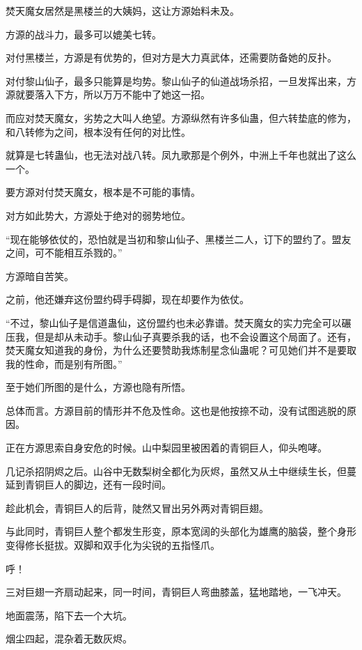 
\begin{this_body}

焚天魔女居然是黑楼兰的大姨妈，这让方源始料未及。

方源的战斗力，最多可以媲美七转。

对付黑楼兰，方源是有优势的，但对方是大力真武体，还需要防备她的反扑。

对付黎山仙子，最多只能算是均势。黎山仙子的仙道战场杀招，一旦发挥出来，方源就要落入下方，所以万万不能中了她这一招。

而应对焚天魔女，劣势之大叫人绝望。方源纵然有许多仙蛊，但六转垫底的修为，和八转修为之间，根本没有任何的对比性。

就算是七转蛊仙，也无法对战八转。凤九歌那是个例外，中洲上千年也就出了这么一个。

要方源对付焚天魔女，根本是不可能的事情。

对方如此势大，方源处于绝对的弱势地位。

“现在能够依仗的，恐怕就是当初和黎山仙子、黑楼兰二人，订下的盟约了。盟友之间，可不能相互杀戮的。”

方源暗自苦笑。

之前，他还嫌弃这份盟约碍手碍脚，现在却要作为依仗。

“不过，黎山仙子是信道蛊仙，这份盟约也未必靠谱。焚天魔女的实力完全可以碾压我，但是却从未动手。黎山仙子真要杀我的话，也不会设置这个局面了。还有，焚天魔女知道我的身份，为什么还要赞助我炼制星念仙蛊呢？可见她们并不是要取我的性命，而是别有所图。”

至于她们所图的是什么，方源也隐有所悟。

总体而言。方源目前的情形并不危及性命。这也是他按捺不动，没有试图逃脱的原因。

正在方源思索自身安危的时候。山中梨园里被困着的青铜巨人，仰头咆哮。

几记杀招阴烬之后。山谷中无数梨树全都化为灰烬，虽然又从土中继续生长，但蔓延到青铜巨人的脚边，还有一段时间。

趁此机会，青铜巨人的后背，陡然又冒出另外两对青铜巨翅。

与此同时，青铜巨人整个都发生形变，原本宽阔的头部化为雄鹰的脑袋，整个身形变得修长挺拔。双脚和双手化为尖锐的五指怪爪。

呼！

三对巨翅一齐扇动起来，同一时间，青铜巨人弯曲膝盖，猛地踏地，一飞冲天。

地面震荡，陷下去一个大坑。

烟尘四起，混杂着无数灰烬。


\end{this_body}
